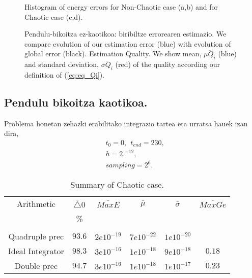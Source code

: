 \begin{figure}[!h]
\centering
{}
\caption{ \small Histogram of energy errors for Non-Chaotic case (a,b) and for Chaotic case (c,d).}
\label{fig:brouwer103}
\end{figure}


\begin{figure}[!h]
\centering
{}
\caption[Pendulu-bikoitza ez-kaotikoa: biribiltze errorearen estimazio.]

{\small Pendulu-bikoitza ez-kaotikoa: biribiltze errorearen estimazio. We compare evolution of our estimation error (blue) with evolution of global error (black). Estimation Quality. We show mean, $\bar{\mu Q_i}$ (blue) and  standard deviation, $\bar{\sigma Q_i}$ (red) of the quality according our definition of (\ref{eq:eq_Qi}).}
\label{fig:plotest}
\end{figure}

\clearpage
\subsection{Pendulu bikoitza kaotikoa.}

Problema honetan zehazki erabilitako integrazio tartea eta urratsa hauek izan dira,
\begin{align*}
& t_0=0, \ \ t_{end}=230, \\
& h=2.^{-12}, \\
& sampling=2^6. 
\end{align*} 


\begin{table} [h]
\caption{Summary of Chaotic case.}
\label{tab:3}       %
\begin{tabular}{c|c c c c c} 
 Arithmetic   &  $\bar{\triangle}0$  &  $\bar{MaxE}$ & $\bar{\mu}$  & $\bar{\sigma}$   & $\bar{MaxGe}$  \\
                           &   \%            &       &          &            &         \\
 \hline
                         &                 &         &       &             \\
 Quadruple prec          &   $93.6$        &  $2e10^{-19}$  & $7e10^{-22}$ & $1e10^{-20}$    &          \\	    
 Ideal Integrator        &   $98.3$        &  $3e10^{-16}$  & $1e10^{-18}$  & $9e10^{-18}$   & $0.18$    \\
 Double prec             &   $94.7$        &  $3e10^{-16}$  & $1e10^{-18}$  & $1e10^{-17}$   & $0.23$    \\
\end{tabular}
\end{table}


